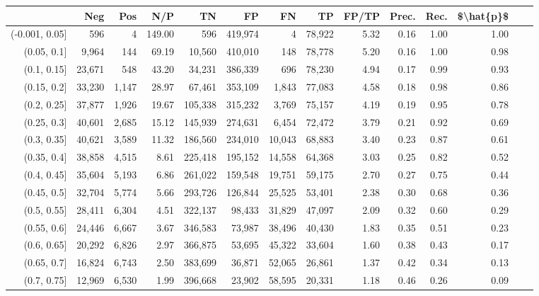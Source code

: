 \begin{tabular}{rrrrrrrrrrrrrr}
\toprule
{} &     Neg &    Pos &     N/P &       TN &       FP &      FN &      TP & FP/TP & Prec. &  Rec. & \$\textbackslash hat\{p\}\$ \\
\midrule
(-0.001, 0.05] &     596 &      4 &  149.00 &      596 &  419,974 &       4 &  78,922 &  5.32 &  0.16 &  1.00 &      1.00 \\
(0.05, 0.1]    &   9,964 &    144 &   69.19 &   10,560 &  410,010 &     148 &  78,778 &  5.20 &  0.16 &  1.00 &      0.98 \\
(0.1, 0.15]    &  23,671 &    548 &   43.20 &   34,231 &  386,339 &     696 &  78,230 &  4.94 &  0.17 &  0.99 &      0.93 \\
(0.15, 0.2]    &  33,230 &  1,147 &   28.97 &   67,461 &  353,109 &   1,843 &  77,083 &  4.58 &  0.18 &  0.98 &      0.86 \\
(0.2, 0.25]    &  37,877 &  1,926 &   19.67 &  105,338 &  315,232 &   3,769 &  75,157 &  4.19 &  0.19 &  0.95 &      0.78 \\
(0.25, 0.3]    &  40,601 &  2,685 &   15.12 &  145,939 &  274,631 &   6,454 &  72,472 &  3.79 &  0.21 &  0.92 &      0.69 \\
(0.3, 0.35]    &  40,621 &  3,589 &   11.32 &  186,560 &  234,010 &  10,043 &  68,883 &  3.40 &  0.23 &  0.87 &      0.61 \\
(0.35, 0.4]    &  38,858 &  4,515 &    8.61 &  225,418 &  195,152 &  14,558 &  64,368 &  3.03 &  0.25 &  0.82 &      0.52 \\
(0.4, 0.45]    &  35,604 &  5,193 &    6.86 &  261,022 &  159,548 &  19,751 &  59,175 &  2.70 &  0.27 &  0.75 &      0.44 \\
(0.45, 0.5]    &  32,704 &  5,774 &    5.66 &  293,726 &  126,844 &  25,525 &  53,401 &  2.38 &  0.30 &  0.68 &      0.36 \\
(0.5, 0.55]    &  28,411 &  6,304 &    4.51 &  322,137 &   98,433 &  31,829 &  47,097 &  2.09 &  0.32 &  0.60 &      0.29 \\
(0.55, 0.6]    &  24,446 &  6,667 &    3.67 &  346,583 &   73,987 &  38,496 &  40,430 &  1.83 &  0.35 &  0.51 &      0.23 \\
(0.6, 0.65]    &  20,292 &  6,826 &    2.97 &  366,875 &   53,695 &  45,322 &  33,604 &  1.60 &  0.38 &  0.43 &      0.17 \\
(0.65, 0.7]    &  16,824 &  6,743 &    2.50 &  383,699 &   36,871 &  52,065 &  26,861 &  1.37 &  0.42 &  0.34 &      0.13 \\
(0.7, 0.75]    &  12,969 &  6,530 &    1.99 &  396,668 &   23,902 &  58,595 &  20,331 &  1.18 &  0.46 &  0.26 &      0.09 \\

\end{tabular}
